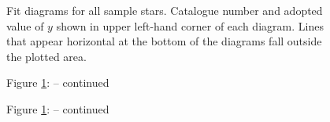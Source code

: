 \newpage


\begin{figure}[H]
\epsfxsize=14cm
\caption[Fit diagrams for all sample stars]
{\fcfont Fit diagrams for all sample stars. Catalogue number and
adopted value of $y$ shown in upper left-hand corner of each
diagram. Lines that appear horizontal at the bottom of the diagrams fall
outside the plotted area.}
\label{fig:allewd}
\end{figure}

\begin{figure}[H]
\epsfxsize=14cm
\begin{center}
\vspace{\abovecaptionskip}
Figure \ref{fig:allewd}: \fcfont -- continued
\end{center}
\end{figure}

\begin{figure}[H]
\epsfxsize=14cm
\begin{center}
\vspace{\abovecaptionskip}
Figure \ref{fig:allewd}: \fcfont -- continued
\end{center}
\end{figure}




